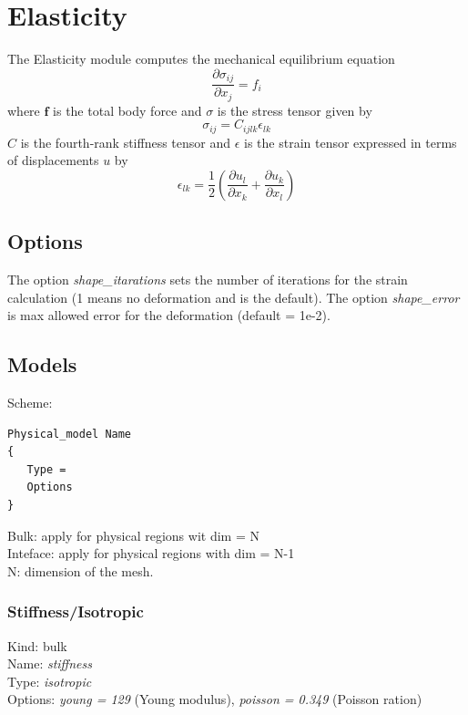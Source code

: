 \chapter{Elasticity}
\label{chap:elasticity}
The Elasticity module computes the mechanical equilibrium equation 
\begin{equation}
\frac{ \partial \sigma_{ij}}{\partial x_j} = f_i
\end{equation}
where $\mathbf{f}$ is the total body force and  $\sigma$ is the stress tensor given by 
\begin{equation}
\sigma_{ij} =C_{ijlk} \epsilon_{lk}
\end{equation}
$C$ is the fourth-rank stiffness tensor and $\epsilon$ is the strain tensor expressed in terms of displacements $u$ by
\begin{equation}
\epsilon_{lk} =\frac{1}{2} \left( \frac{\partial u_l}{\partial x_k} + \frac{\partial u_k}{\partial x_l}\right)
\end{equation}

\section{Options}

The option \emph{shape\_itarations} sets the number of iterations for the strain calculation (1 means no deformation and is the default). The option \emph{shape\_error} is max allowed error for the deformation (default = 1e-2).


\section{Models}
Scheme:
\begin{verbatim}
Physical_model Name
{
   Type = 
   Options
}
\end{verbatim}
\noindent Bulk: apply for physical regions wit dim = N\\
Inteface: apply for physical regions with dim = N-1\\
N: dimension of the mesh.
\subsection{Stiffness/Isotropic} 
Kind: bulk \\
Name: \emph{stiffness}\\
Type: \emph{isotropic}\\
Options:  \emph{young = 129} (Young modulus), \emph{poisson = 0.349} (Poisson ration) 

